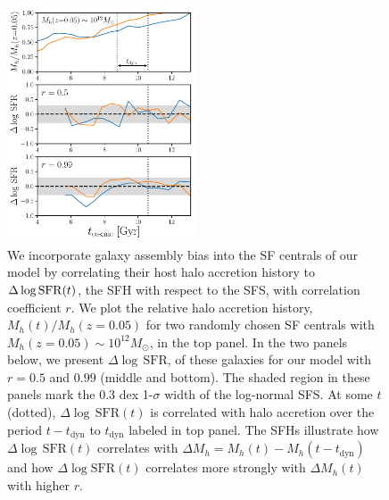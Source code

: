 \documentclass[12pt, letterpaper, preprint, tighten]{aastex62}
\newcommand{\logsfr}{\log\mathrm{SFR}}
\begin{document}
\begin{figure}
\begin{center}
\includegraphics[width=0.5\textwidth]{figs/Mhacc_dSFR.pdf}
\caption{
    We incorporate galaxy assembly bias into the SF centrals of our model by
    correlating their host halo accretion history to $\Delta\log{\rm SFR}(t)$, 
    the SFH with respect to the SFS, with correlation coefficient $r$. 
    We plot the relative halo accretion history, $M_h(t)/M_h(z{=}0.05)$
    for two randomly chosen SF centrals with $M_h(z{=}0.05)\sim10^{12}M_\odot$,
    in the top panel. In the two panels below, we present $\Delta\log\,\mathrm{SFR}$,
    of these galaxies for our model with $r=0.5$ and $0.99$ (middle and bottom). 
    The shaded region in these panels mark the $0.3$ dex 1-$\sigma$ width of the 
    log-normal SFS. At some $t$ (dotted),
    $\Delta\log\,\mathrm{SFR}(t)$ is correlated with halo accretion over the
    period $t - t_\mathrm{dyn}$ to $t_\mathrm{dyn}$ labeled in top panel. The
    SFHs illustrate how $\Delta\log\,\mathrm{SFR}(t)$ correlates with
    $\Delta M_h = M_h(t) - M_h(t-t_\mathrm{dyn})$ and how $\Delta\logsfr(t)$
    correlates more strongly with $\Delta M_h(t)$ with higher $r$.}
\label{fig:mhacc_dsfr}
\end{center}
\end{figure}
\end{document}
